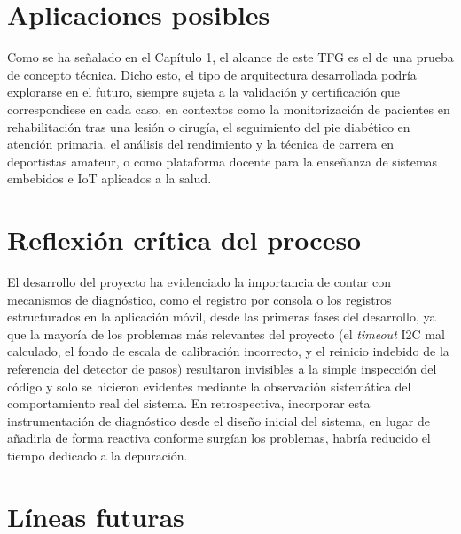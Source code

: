 \begin{IAtext}
\section{Aplicaciones posibles}

Como se ha señalado en el Capítulo 1, el alcance de este TFG es el de una prueba de concepto técnica. Dicho esto, el tipo de arquitectura desarrollada podría explorarse en el futuro, siempre sujeta a la validación y certificación que correspondiese en cada caso, en contextos como la monitorización de pacientes en rehabilitación tras una lesión o cirugía, el seguimiento del pie diabético en atención primaria, el análisis del rendimiento y la técnica de carrera en deportistas amateur, o como plataforma docente para la enseñanza de sistemas embebidos e IoT aplicados a la salud.

\section{Reflexión crítica del proceso}

El desarrollo del proyecto ha evidenciado la importancia de contar con mecanismos de diagnóstico, como el registro por consola o los registros estructurados en la aplicación móvil, desde las primeras fases del desarrollo, ya que la mayoría de los problemas más relevantes del proyecto (el \textit{timeout} I2C mal calculado, el fondo de escala de calibración incorrecto, y el reinicio indebido de la referencia del detector de pasos) resultaron invisibles a la simple inspección del código y solo se hicieron evidentes mediante la observación sistemática del comportamiento real del sistema. En retrospectiva, incorporar esta instrumentación de diagnóstico desde el diseño inicial del sistema, en lugar de añadirla de forma reactiva conforme surgían los problemas, habría reducido el tiempo dedicado a la depuración.

\section{Líneas futuras}\label{sec:lineas_futuras}


\end{IAtext}
